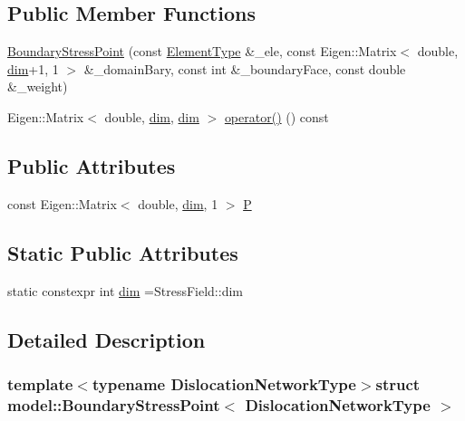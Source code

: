 \subsection*{Public Member Functions}
\begin{DoxyCompactItemize}
\item 
\hyperlink{structmodel_1_1_boundary_stress_point_af83b6c42b55e80c97e3ff6d135bdaf7c}{Boundary\+Stress\+Point} (const \hyperlink{structmodel_1_1_boundary_stress_point_abbe62ae453e93d99f80b043f4de9bf04}{Element\+Type} \&\+\_\+ele, const Eigen\+::\+Matrix$<$ double, \hyperlink{structmodel_1_1_boundary_stress_point_a129a979e1b40752a4075d2e4ff084e6e}{dim}+1, 1 $>$ \&\+\_\+domain\+Bary, const int \&\+\_\+boundary\+Face, const double \&\+\_\+weight)
\item 
Eigen\+::\+Matrix$<$ double, \hyperlink{structmodel_1_1_boundary_stress_point_a129a979e1b40752a4075d2e4ff084e6e}{dim}, \hyperlink{structmodel_1_1_boundary_stress_point_a129a979e1b40752a4075d2e4ff084e6e}{dim} $>$ \hyperlink{structmodel_1_1_boundary_stress_point_a36676d74955eb460af2505105a9ef597}{operator()} () const 
\end{DoxyCompactItemize}
\subsection*{Public Attributes}
\begin{DoxyCompactItemize}
\item 
const Eigen\+::\+Matrix$<$ double, \hyperlink{structmodel_1_1_boundary_stress_point_a129a979e1b40752a4075d2e4ff084e6e}{dim}, 1 $>$ \hyperlink{structmodel_1_1_boundary_stress_point_a7b022843a28dc60431e4c7a473e2122c}{P}
\end{DoxyCompactItemize}
\subsection*{Static Public Attributes}
\begin{DoxyCompactItemize}
\item 
static constexpr int \hyperlink{structmodel_1_1_boundary_stress_point_a129a979e1b40752a4075d2e4ff084e6e}{dim} =Stress\+Field\+::dim
\end{DoxyCompactItemize}


\subsection{Detailed Description}
\subsubsection*{template$<$typename Dislocation\+Network\+Type$>$struct model\+::\+Boundary\+Stress\+Point$<$ Dislocation\+Network\+Type $>$}



